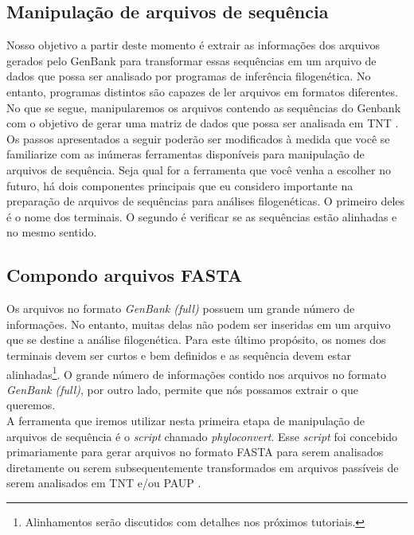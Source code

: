 \begin{refsection}
\section{Manipulação de arquivos de sequência}\label{tut7:handling_files}

Nosso objetivo a partir deste momento é extrair as informações dos arquivos gerados pelo GenBank para transformar essas sequências em um arquivo de dados que possa ser analisado por programas de inferência filogenética. No entanto, programas distintos são capazes de ler arquivos em formatos diferentes. No que se segue, manipularemos os arquivos contendo as sequências do Genbank com o objetivo de gerar uma matriz de dados que possa ser analisada em TNT \parencite{GoloboffEtAl_2008}. Os passos apresentados a seguir poderão ser modificados à medida que você se familiarize com as inúmeras ferramentas disponíveis para manipulação de arquivos de sequência. Seja qual for a ferramenta que você venha a escolher no futuro, há dois componentes principais que eu considero importante na preparação de arquivos de sequências para análises filogenéticas. O primeiro deles é o nome dos terminais. O segundo é verificar se as sequências estão alinhadas e no mesmo sentido.

\subsection{Compondo arquivos FASTA}\label{tut7:handling_files:phyloconvert}

Os arquivos no formato \textit{GenBank (full)} possuem um grande número de informações. No entanto, muitas delas não podem ser inseridas em um arquivo que se destine a análise filogenética. Para este último propósito, os nomes dos terminais devem ser curtos e bem definidos e as sequência devem estar alinhadas\footnote{ Alinhamentos serão discutidos com detalhes nos próximos tutoriais.}. O grande número de informações contido nos arquivos no formato \textit{GenBank (full)}, por outro lado, permite que nós possamos extrair o que queremos.\\

A ferramenta que iremos utilizar nesta primeira etapa de manipulação de arquivos de sequência é o \textit{script} chamado  \textit{phyloconvert}. Esse \textit{script} foi concebido primariamente para gerar arquivos no formato FASTA para serem analisados diretamente ou serem subsequentemente transformados em arquivos passíveis de serem analisados em TNT e/ou PAUP \parencite{Swofford_2003,GoloboffEtAl_2008}.\\


\end{refsection}
